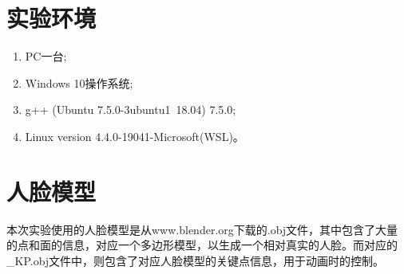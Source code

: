 \documentclass{ctexart}
\begin{document}
\section{\hei 实验环境}
\begin{enumerate}
    \item PC一台;
    \item Windows 10操作系统;
    \item g++ (Ubuntu 7.5.0-3ubuntu1~18.04) 7.5.0;
    \item Linux version 4.4.0-19041-Microsoft(WSL)。
\end{enumerate}

\section{\hei 人脸模型}
本次实验使用的人脸模型是从www.blender.org下载的.obj文件，其中包含了大量的点和面的信息，对应一个多边形模型，以生成一个相对真实的人脸。而对应的\_KP.obj文件中，则包含了对应人脸模型的关键点信息，用于动画时的控制。
\end{document}
